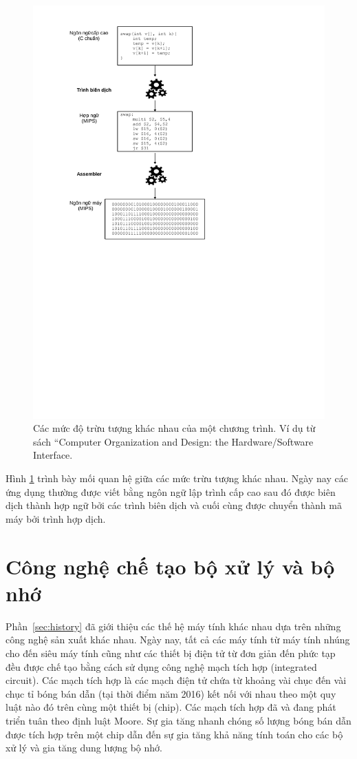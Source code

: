 \begin{figure}[!h]
	\centering
		\includegraphics[width=0.75\columnwidth]{chapter01/figure/abstraction}
		\centering
	\caption{Các mức độ trừu tượng khác nhau của một chương trình. Ví dụ từ sách ``Computer Organization and Design: the Hardware/Software Interface.}
	\label{fig:abstraction}
\end{figure}

Hình \ref{fig:abstraction} trình bày mối quan hệ giữa các mức trừu tượng khác nhau. Ngày nay các ứng dụng thường được viết bằng ngôn ngữ lập trình cấp cao sau đó được biên dịch thành hợp ngữ bởi các trình biên dịch và cuối cùng được chuyển thành mã máy bởi trình hợp dịch.

\section{Công nghệ chế tạo bộ xử lý và bộ nhớ}

Phần~\ref{sec:history} đã giới thiệu các thế hệ máy tính khác nhau dựa trên những công nghệ sản xuất khác nhau. Ngày nay, tất cả các máy tính từ máy tính nhúng cho đến siêu máy tính cũng như các thiết bị điện tử từ đơn giản đến phức tạp đều được chế tạo bằng cách sử dụng công nghệ mạch tích hợp (integrated circuit). Các mạch tích hợp là các mạch điện tử chứa từ khoảng vài chục đến vài chục tỉ bóng bán dẫn (tại thời điểm năm 2016) kết nối với nhau theo một quy luật nào đó trên cùng một thiết bị (chip). Các mạch tích hợp đã và đang phát triển tuân theo định luật Moore. Sự gia tăng nhanh chóng số lượng bóng bán dẫn được tích hợp trên một chip dẫn đến sự gia tăng khả năng tính toán cho các bộ xử lý và gia tăng dung lượng bộ nhớ.

